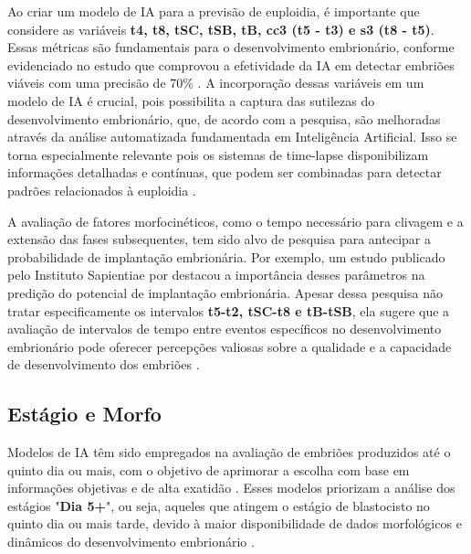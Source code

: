 Ao criar um modelo de IA para a previsão de euploidia, é importante que considere as variáveis \textbf{t4, t8, tSC, tSB, tB, cc3 (t5 - t3) e s3 (t8 - t5)}. Essas métricas são fundamentais para o desenvolvimento embrionário, conforme evidenciado no estudo que comprovou a efetividade da IA em detectar embriões viáveis com uma precisão de 70\% \cite{rienzi2020}. A incorporação dessas variáveis em um modelo de IA é crucial, pois possibilita a captura das sutilezas do desenvolvimento embrionário, que, de acordo com a pesquisa, são melhoradas através da análise automatizada fundamentada em Inteligência Artificial. Isso se torna especialmente relevante pois os sistemas de time-lapse disponibilizam informações detalhadas e contínuas, que podem ser combinadas para detectar padrões relacionados à euploidia \cite{rienzi2020}.

A avaliação de fatores morfocinéticos, como o tempo necessário para clivagem e a extensão das fases subsequentes, tem sido alvo de pesquisa para antecipar a probabilidade de implantação embrionária. Por exemplo, um estudo publicado pelo Instituto Sapientiae por  destacou a importância desses parâmetros na predição do potencial de implantação embrionária. Apesar dessa pesquisa não tratar especificamente os intervalos \textbf{t5-t2, tSC-t8 e tB-tSB}, ela sugere que a avaliação de intervalos de tempo entre eventos específicos no desenvolvimento embrionário pode oferecer percepções valiosas sobre a qualidade e a capacidade de desenvolvimento dos embriões \cite{desai2019}.

\subsection{Estágio e Morfo}

Modelos de IA têm sido empregados na avaliação de embriões produzidos até o quinto dia ou mais, com o objetivo de aprimorar a escolha com base em informações objetivas e de alta exatidão \cite{lassen2022}. Esses modelos priorizam a análise dos estágios "\textbf{Dia 5+}", ou seja, aqueles que atingem o estágio de blastocisto no quinto dia ou mais tarde, devido à maior disponibilidade de dados morfológicos e dinâmicos do desenvolvimento embrionário \cite{lassen2022}. 

